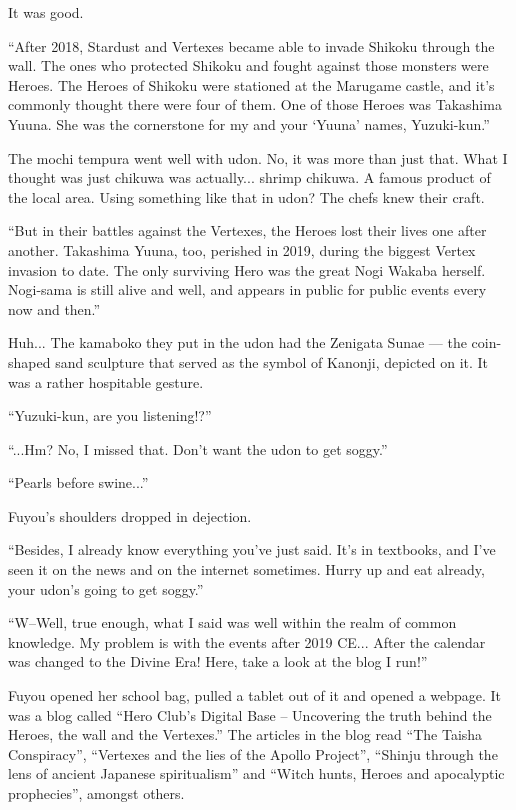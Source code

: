 It was good.

``After 2018, Stardust and Vertexes became able to invade Shikoku through the wall. The ones who protected Shikoku and fought against those monsters were Heroes. The Heroes of Shikoku were stationed at the Marugame castle, and it's commonly thought there were four of them. One of those Heroes was Takashima Yuuna. She was the cornerstone for my and your `Yuuna' names, Yuzuki-kun.''

The mochi tempura went well with udon. No, it was more than just that. What I thought was just chikuwa was actually... shrimp chikuwa. A famous product of the local area. Using something like that in udon? The chefs knew their craft.

``But in their battles against the Vertexes, the Heroes lost their lives one after another. Takashima Yuuna, too, perished in 2019, during the biggest Vertex invasion to date. The only surviving Hero was the great Nogi Wakaba herself. Nogi-sama is still alive and well, and appears in public for public events every now and then.''

Huh... The kamaboko they put in the udon had the Zenigata Sunae --- the coin-shaped sand sculpture that served as the symbol of Kanonji, depicted on it. It was a rather hospitable gesture.

``Yuzuki-kun, are you listening!?''

``...Hm? No, I missed that. Don't want the udon to get soggy.''

``Pearls before swine...''

Fuyou's shoulders dropped in dejection.

``Besides, I already know everything you've just said. It's in textbooks, and I've seen it on the news and on the internet sometimes. Hurry up and eat already, your udon's going to get soggy.''

``W--Well, true enough, what I said was well within the realm of common knowledge. My problem is with the events after 2019 CE... After the calendar was changed to the Divine Era! Here, take a look at the blog I run!''

Fuyou opened her school bag, pulled a tablet out of it and opened a webpage. It was a blog called ``Hero Club's Digital Base -- Uncovering the truth behind the Heroes, the wall and the Vertexes.'' The articles in the blog read ``The Taisha Conspiracy'', ``Vertexes and the lies of the Apollo Project'', ``Shinju through the lens of ancient Japanese spiritualism'' and ``Witch hunts, Heroes and apocalyptic prophecies'', amongst others.

